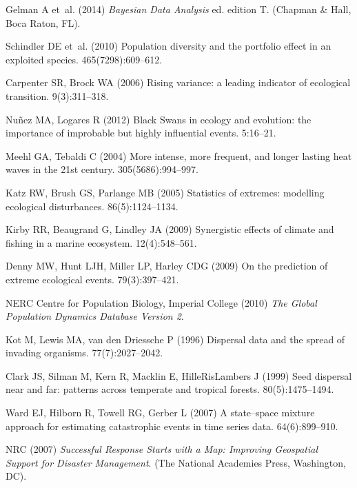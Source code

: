 \documentclass[9pt,twocolumn,twoside]{pnas-new}
\begin{document}
\begin{thebibliography}{10}
Gelman A et~al. (2014) {\em Bayesian Data Analysis} ed.{} edition T.
\newblock (Chapman {\&} Hall, Boca Raton, FL).

Schindler DE et~al. (2010) Population diversity and the portfolio effect in an
  exploited species.
 465(7298):609--612.

Carpenter SR, Brock WA (2006) Rising variance: a leading indicator of
  ecological transition.
 9(3):311--318.

Nu{\~n}ez MA, Logares R (2012) {Black Swans} in ecology and evolution: the
  importance of improbable but highly influential events.
 5:16--21.

Meehl GA, Tebaldi C (2004) More intense, more frequent, and longer lasting heat
  waves in the 21st century.
 305(5686):994--997.

Katz RW, Brush GS, Parlange MB (2005) Statistics of extremes: modelling
  ecological disturbances.
 86(5):1124--1134.

Kirby RR, Beaugrand G, Lindley JA (2009) Synergistic effects of climate and
  fishing in a marine ecosystem.
 12(4):548--561.

Denny MW, Hunt LJH, Miller LP, Harley CDG (2009) On the prediction of extreme
  ecological events.
 79(3):397--421.

{NERC Centre for Population Biology, Imperial College} (2010) {\em {The Global
  Population Dynamics Database Version 2}}.

Kot M, Lewis MA, {van den Driessche} P (1996) Dispersal data and the spread of
  invading organisms.
 77(7):2027--2042.

Clark JS, Silman M, Kern R, Macklin E, HilleRisLambers J (1999) Seed dispersal
  near and far: patterns across temperate and tropical forests.
 80(5):1475--1494.

Ward EJ, Hilborn R, Towell RG, Gerber L (2007) A state--space mixture approach
  for estimating catastrophic events in time series data.
 64(6):899--910.

{NRC} (2007) {\em Successful Response Starts with a Map: Improving Geospatial
  Support for Disaster Management}.
\newblock (The National Academies Press, Washington, {DC}).


\end{thebibliography}
\end{document}
